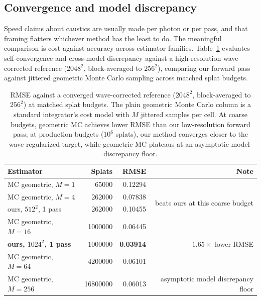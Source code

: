 \subsection{Convergence and model discrepancy}
\label{sec:results-cost}

Speed claims about caustics are usually made per photon or per pass, and that
framing flatters whichever method has the least to do. The meaningful
comparison is cost against accuracy across estimator families. Table~\ref{tab:efficiency}
evaluates self-convergence and cross-model discrepancy against a high-resolution
wave-corrected reference ($2048^2$, block-averaged to $256^2$), comparing our
forward pass against jittered geometric Monte Carlo sampling across matched splat budgets.

\begin{table}[tp]
\centering
\caption{RMSE against a converged wave-corrected reference ($2048^2$, block-averaged
to $256^2$) at matched splat budgets. The plain geometric Monte Carlo column is a
standard integrator's cost model with $M$ jittered samples per cell. At coarse budgets,
geometric MC achieves lower RMSE than our low-resolution forward pass; at production
budgets ($10^6$ splats), our method converges closer to the wave-regularized target,
while geometric MC plateaus at an asymptotic model-discrepancy floor.}
\label{tab:efficiency}
\footnotesize
\begin{tabular*}{\textwidth}{@{\extracolsep{\fill}}lrrr@{}}
\toprule
Estimator & Splats & RMSE & Note \\
\midrule
MC geometric, $M{=}1$    & \num{65000}  & 0.12294 & \\
MC geometric, $M{=}4$    & \num{262000} & 0.07838 & \multirow{2}{*}{beats ours at this coarse budget} \\
ours, $512^2$, 1 pass    & \num{262000} & 0.10455 & \\
\midrule
MC geometric, $M{=}16$   & \num{1000000} & 0.06445 & \\
\textbf{ours, $1024^2$, 1 pass} & \num{1000000} & \textbf{0.03914} & $1.65\times$ lower RMSE \\
\midrule
MC geometric, $M{=}64$   & \num{4200000} & 0.06101 & \\
MC geometric, $M{=}256$  & \num{16800000} & 0.06013 & asymptotic model discrepancy floor \\
\bottomrule
\end{tabular*}
\end{table}

